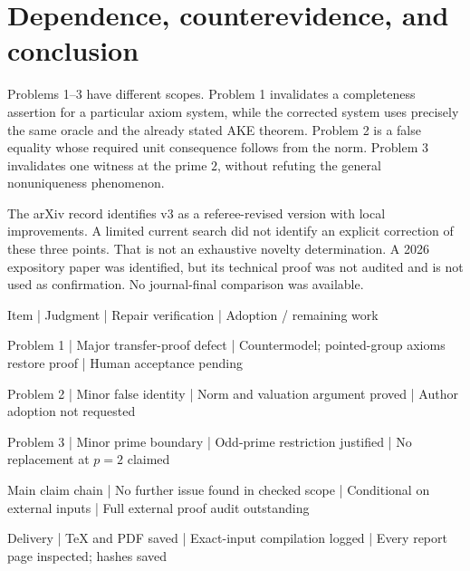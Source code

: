 \documentclass[10pt]{article}
\begin{document}
\section*{Dependence, counterevidence, and conclusion}
Problems 1–3 have different scopes. Problem 1 invalidates a completeness assertion for a particular axiom system, while the corrected system uses precisely the same oracle and the already stated AKE theorem. Problem 2 is a false equality whose required unit consequence follows from the norm. Problem 3 invalidates one witness at the prime \(2\), without refuting the general nonuniqueness phenomenon.\par
The arXiv record identifies v3 as a referee-revised version with local improvements. A limited current search did not identify an explicit correction of these three points. That is not an exhaustive novelty determination. A 2026 expository paper was identified, but its technical proof was not audited and is not used as confirmation. No journal-final comparison was available.\par
Item | Judgment | Repair verification | Adoption / remaining work\par
Problem 1 | Major transfer-proof defect | Countermodel; pointed-group axioms restore proof | Human acceptance pending\par
Problem 2 | Minor false identity | Norm and valuation argument proved | Author adoption not requested\par
Problem 3 | Minor prime boundary | Odd-prime restriction justified | No replacement at \(p=2\) claimed\par
Main claim chain | No further issue found in checked scope | Conditional on external inputs | Full external proof audit outstanding\par
Delivery | TeX and PDF saved | Exact-input compilation logged | Every report page inspected; hashes saved\par
\end{document}
